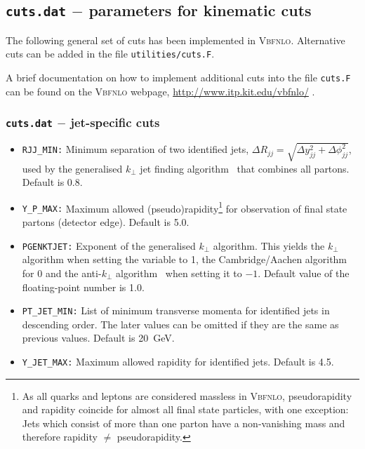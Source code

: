 \documentclass[english,12pt]{article}
\newcommand{\VBFNLO}{\textsc{Vbfnlo}}
\begin{document}

\subsection{{\tt cuts.dat} $-$ parameters for kinematic cuts}
\label{sec:cuts}
%
The following general set of cuts has been implemented in \textsc{Vbfnlo}.  Alternative cuts can be added in the file {\tt utilities/cuts.F}. 

A brief documentation on how to implement additional cuts into the file {\tt cuts.F}
can be found on the \VBFNLO{} webpage,
\href{http://www.itp.kit.edu/vbfnlo/}{http://www.itp.kit.edu/vbfnlo/} .

\subsubsection{{\tt cuts.dat} $-$ jet-specific cuts}

\begin{itemize}
\item {\tt RJJ\_MIN:} Minimum separation of two identified jets, $\Delta R_{jj}=
\sqrt{\Delta y^{2}_{jj}+\Delta \phi^{2}_{jj}}$, used by the generalised
$k_\perp$ jet finding algorithm~\cite{Seymour:1997kj} that combines all partons.
 Default is 0.8.
\item {\tt Y\_P\_MAX:} Maximum allowed (pseudo)rapidity\footnote{As all quarks and leptons are considered massless in \textsc{Vbfnlo},
       pseudorapidity and rapidity coincide for almost all final state particles, with one exception: Jets which consist of more than one parton
       have a non-vanishing mass and therefore rapidity $\neq$ pseudorapidity.} for observation of final state 
partons (detector edge).  Default is 5.0.
\item {\tt PGENKTJET:} Exponent of the generalised $k_\perp$ algorithm.
  This yields the $k_\perp$ algorithm when setting
  the variable to 1, the Cambridge/Aachen
  algorithm~\cite{Dokshitzer:1997in} for 0 and the anti-$k_\perp$
  algorithm~\cite{Cacciari:2008gp} when setting it to $-1$. 
  Default value of the floating-point number is 1.0.
\item {\tt PT\_JET\_MIN:} List of minimum transverse momenta for identified jets
in descending order. The later values can be omitted if they are the same as
previous values. Default is 20~GeV.
\item {\tt Y\_JET\_MAX:} Maximum allowed rapidity for identified jets. 
Default is 4.5.
\end{itemize}
\end{document}

